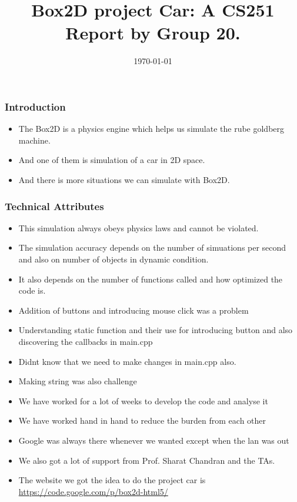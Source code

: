\documentclass{beamer}
\author[Abhinav \& Surya \& Rishabh]
{%
   \texorpdfstring{
        \begin{columns}
            \column{.4\linewidth}
            \centering
            Abhinav\\
            {140050054}\\
            {abhinavrondi11296@gmail.com}
            \column{.4\linewidth}
            \centering
            Surya\\
            {140050055}\\
            {suri892010@gmail.com}
            \column{.33\linewidth}
            \centering
            Rishabh\\
            {140050061}\\
            {rishabh6417@gmail.com}
        \end{columns}
   }
   {John Doe \& Jane Doe}
}
\title{Box2D project Car: A CS251 Report by Group 20.}
\date{\today}
\begin{document}
\begin{frame}
\titlepage
\end{frame}
\begin{frame}
\frametitle{Introduction}
\begin{itemize}
\item The Box2D is a physics engine which helps us simulate the rube goldberg machine.
\item And one of them is simulation of a car in 2D space.
\item And there is more situations we can simulate with Box2D.
\end{itemize}
\end{frame}
\begin{frame}
\frametitle{Technical Attributes}
\begin{itemize}
\item This simulation always obeys physics laws and cannot be violated.
\item The simulation accuracy depends on the number of simuations per second and also on number of objects in dynamic condition.
\item It also depends on the number of functions called and how optimized the code is.
\end{itemize}
\end{frame}
\begin{frame}
\begin{itemize}
\frametitle{Challenges faced }
\item Addition of buttons and introducing mouse click was a problem
\item Understanding static function and their use for introducing button and also discovering the callbacks in main.cpp
\item Didnt know that we need to make changes in main.cpp also.
\item Making string was also challenge
\end{itemize}
\end{frame}
\begin{frame}
\begin{itemize}
\frametitle{Efforts }
\item We have worked for a lot of weeks to develop the code and analyse it
\item We have worked hand in hand to reduce the burden from each other
\end{itemize}
\end{frame}
\begin{frame}
\begin{itemize}
\frametitle{Acknowledgements }
\item Google was always there whenever we wanted except when the lan was out
\item We also got a lot of support from Prof. Sharat Chandran and the TAs.
\item The website we got the idea to do the project car is \url{https://code.google.com/p/box2d-html5/}
\end{itemize}
\end{frame}
\end{document}
